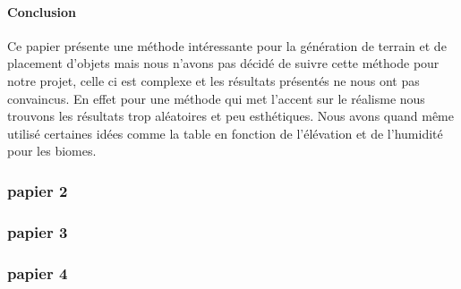     \paragraph{Conclusion} Ce papier présente une méthode intéressante pour la génération de terrain et de placement d'objets mais nous n'avons pas décidé de suivre cette méthode pour notre projet, celle ci est complexe et les résultats présentés ne nous ont pas convaincus. En effet pour une méthode qui met l'accent sur le réalisme nous trouvons les résultats trop aléatoires et peu esthétiques.
    Nous avons quand même utilisé certaines idées comme la table en fonction de l'élévation et de l'humidité pour les biomes.



    
        \subsubsection{papier 2}
        \subsubsection{papier 3}
        \subsubsection{papier 4}